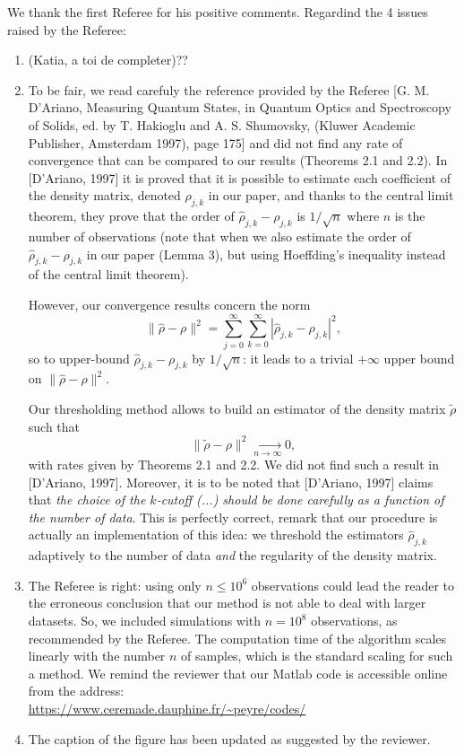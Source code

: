 \documentclass[a4paper]{article}
\begin{document}
We thank the first Referee for his positive comments.
Regardind the 4 issues raised by the Referee:
\begin{enumerate}
 \item (Katia, a toi de completer)??
 \item To be fair, we read carefuly the reference provided by the Referee
 [G. M. D'Ariano, Measuring
Quantum States, in Quantum Optics and Spectroscopy of Solids, ed. by
T. Hakioglu and A. S. Shumovsky, (Kluwer Academic Publisher, Amsterdam
1997), page 175] and did not find any rate of convergence that can
be compared to our results (Theorems 2.1 and 2.2). In [D'Ariano, 1997]
it is proved that it is possible to estimate each coefficient of the density
matrix, denoted $\rho_{j,k}$ in our paper, and thanks to the central limit theorem,
they prove that the order of $\hat{\rho}_{j,k}-\rho_{j,k}$ is $1/\sqrt{n}$
where $n$ is the number of observations (note that when we also estimate the
order of $\hat{\rho}_{j,k}-\rho_{j,k}$ in our paper (Lemma 3), but using
Hoeffding's inequality instead of the central limit theorem).

However, our convergence results concern the norm
$$ \|\hat{\rho} - \rho \|^2 = \sum_{j=0}^{\infty} \sum_{k=0}^{\infty}
                            |\hat{\rho}_{j,k}-\rho_{j,k}|^2, $$
so to upper-bound $\hat{\rho}_{j,k}-\rho_{j,k}$ by $1/\sqrt{n}$: it leads
to a trivial $+\infty$ upper bound on $ \|\hat{\rho} - \rho \|^2 $.

Our thresholding method allows to build an estimator of the density
matrix $\tilde{\rho}$ such that
$$ \|\tilde{\rho} - \rho \|^2 \xrightarrow[n\rightarrow\infty]{} 0,$$
with rates given by Theorems 2.1 and 2.2. We did not find such a result
in [D'Ariano, 1997]. Moreover, it is to be noted that [D'Ariano, 1997]
claims that {\it the choice of the $k$-cutoff (...) should be done
carefully as a function of the number of data}. This is perfectly correct,
remark that our procedure is actually an implementation of this idea: we
threshold the estimators $\hat{\rho}_{j,k}$ adaptively to the number of
data {\it and} the regularity of the density matrix.

 \item The Referee is right: using only $n \leq 10^6$ observations
 could lead the reader to the erroneous conclusion that our method is
 not able to deal with larger datasets. So, we included simulations with
 $n=10^8$ observations, as recommended by the Referee.
 The computation time of the algorithm scales linearly with the number $n$ of samples, which is the standard scaling for 
 such a method. We remind the reviewer that our Matlab code is accessible online from the address: \\
 \url{https://www.ceremade.dauphine.fr/~peyre/codes/}
 
 
 \item The caption of the figure has been updated as suggested by the reviewer. 
\end{enumerate}
\end{document}
